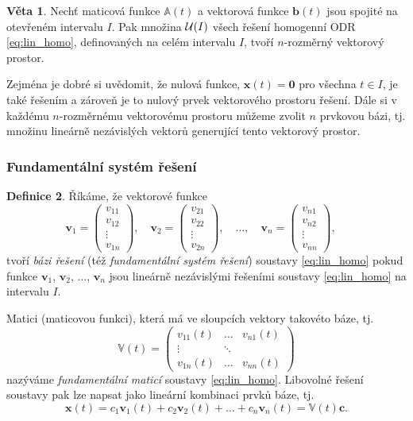 \documentclass[a4paper, 12pt]{book}
\theoremstyle{definition}
\newtheorem{theorem}{Věta}[section]
\newtheorem{definition}[theorem]{Definice}
\def\vc#1{\mathbf{\boldsymbol{#1}}}     %
\def\tn#1{{\mathbb{#1}}}    %
\def\df#1{\emph{#1}}
\begin{document}
\begin{theorem}
Nechť maticová funkce $\tn A(t)$ a vektorová funkce $\vc b(t)$ jsou spojité na otevřeném intervalu $I$. Pak množina 
${\cal U}(I)$ všech řešení homogenní ODR \eqref{eq:lin_homo}, definovaných na celém intervalu $I$,
tvoří $n$-rozměrný vektorový prostor.
\end{theorem}

Zejména je dobré si uvědomit, že nulová funkce, $\vc x(t) = \vc 0$ pro všechna $t\in I$, je také řešením a zároveň je to nulový prvek 
vektorového prostoru řešení. Dále si v každému $n$-rozměrnému vektorovému prostoru můžeme zvolit $n$ prvkovou bázi, tj. 
množinu lineárně nezávislých vektorů generující tento vektorový prostor.

\subsubsection{Fundamentální systém řešení}
\begin{definition}
Říkáme, že vektorové funkce
%
\begin{equation}
\label{eq:baze_reseni}
\vc v_1 =
\begin{pmatrix}
    v_{11}\\ v_{12}\\ \vdots\\ v_{1n}
\end{pmatrix},
\quad
\vc v_2 =
\begin{pmatrix}
    v_{21}\\ v_{22}\\ \vdots\\ v_{2n}
\end{pmatrix},
\quad
\dots,
\quad
\vc v_n =
\begin{pmatrix}
    v_{n1}\\ v_{n2}\\ \vdots\\ v_{nn}
\end{pmatrix},
\quad
\end{equation}
%
tvoří \emph{bázi řešení} (též \emph{fundamentální systém řešení}) soustavy
\eqref{eq:lin_homo}
pokud funkce $\vc v_1$, $\vc v_2$, $\dots$, $\vc v_n$ jsou 
lineárně nezávislými řešeními soustavy \eqref{eq:lin_homo} na intervalu $I$.

Matici (maticovou funkci), která má ve sloupcích vektory takovéto báze, tj.
\[
    {\tn V}(t) = 
    \begin{pmatrix}
        v_{11}(t) &  \dots& v_{n1}(t)\\
        \vdots& \ddots &\\
        v_{1n}(t) & \dots& v_{nn}(t)
    \end{pmatrix}
\]
nazýváme \df{fundamentální maticí} soustavy \eqref{eq:lin_homo}. Libovolné řešení soustavy 
pak lze napsat jako lineární kombinaci prvků báze, tj.
\begin{equation}
  \label{eq:obecny_tvar}
  \vc x(t) = c_1 \vc v_1(t) + c_2 \vc v_2(t) + \dots + c_n\vc v_n(t) = \tn V(t) \vc c.
\end{equation}
\end{definition}
\end{document}
